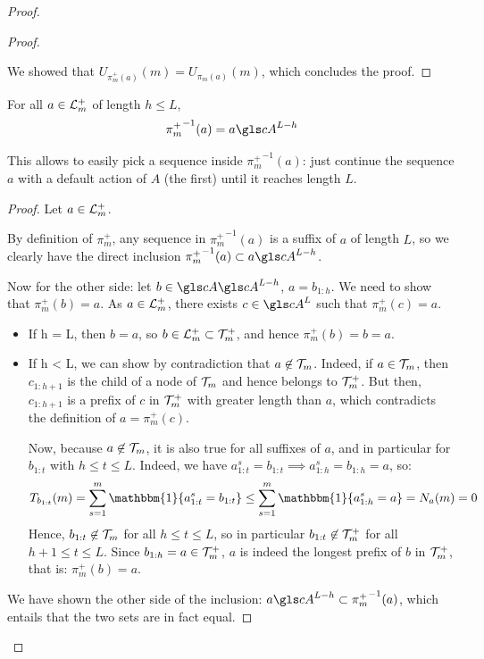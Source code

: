 \begin{proof}
\begin{proof}
\begin{itemize}
		\end{itemize}
		We showed that $U_{\pi_m^+(a)}(m) = U_{\pi_m(a)}(m)$, which concludes the proof.
	\end{proof}
	
	\begin{lemma}
		\begin{leftbar}[lemmabar]
		\label{lemma:inverse-proj}
		For all $a\in \mathcal{L}_m^+$ of length $h\leq L$,
		\begin{equation*}
		{\pi_m^+}^{-1}(a) = a \cA^{L-h}
		\end{equation*}
		
		This allows to easily pick a sequence inside ${\pi_m^+}^{-1}(a)$: just continue the sequence $a$ with a default action of $A$ (\eg the first) until it reaches length $L$.
		\end{leftbar}
	\end{lemma}
	\begin{proof}
		Let $a\in \mathcal{L}_m^+$. 
		
		By definition of $\pi_m^+$, any sequence in ${\pi_m^+}^{-1}(a)$ is a suffix of $a$ of length $L$, so we clearly have the direct inclusion ${\pi_m^+}^{-1}(a) \subset a \cA^{L-h}$.
		
		Now for the other side: let $b\in \cA \cA^{L-h}$, \ie $a=b_{1:h}$. We need to show that $\pi_m^+(b) = a$.
		As $a\in \mathcal{L}_m^+$, there exists $c\in \cA^L$ such that $\pi_m^+(c) = a$.
		\begin{itemize}
			\item If h = L, then $b=a$, so $b \in \mathcal{L}_m^+ \subset \mathcal{T}_m^+$, and hence $\pi_m^+(b)=b=a$.
			\item If h < L, we can show by contradiction that $a \not \in \mathcal{T}_m$. Indeed, if $a \in \mathcal{T}_m$, then $c_{1:h+1}$ is the child of a node of $\mathcal{T}_m$ and hence belongs to $\mathcal{T}_m^+$. But then, $c_{1:h+1}$ is a prefix of $c$ in $\mathcal{T}_m^+$ with greater length than $a$, which contradicts the definition of $a = \pi_m^+(c)$.
			
			Now, because $a \not \in \mathcal{T}_m$, it is also true for all suffixes of $a$, and in particular for $b_{1:t}$ with $h \leq t \leq L$. Indeed, we have $a^s_{1:t} = b_{1:t} \implies a^s_{1:h} = b_{1:h} = a$, so:
			\begin{equation*}
			T_{b_{1:t}}(m) = \sum_{s=1}^m \mathbbm{1}\{a^s_{1:t} = b_{1:t}\} \leq \sum_{s=1}^m \mathbbm{1}\{a^s_{1:h} = a\} = N_a(m) = 0
			\end{equation*}
			Hence, $b_{1:t} \not \in \mathcal{T}_m$ for all $h \leq t \leq L$, so in particular $b_{1:t} \not \in \mathcal{T}_m^+$ for all $h+1 \leq t \leq L$. Since $b_{1:h} = a \in \mathcal{T}_m^+$, $a$ is indeed the longest prefix of $b$ in $\mathcal{T}_m^+$, that is: $\pi_m^+(b) = a$.
		\end{itemize}
		We have shown the other side of the inclusion: $a \cA^{L-h} \subset {\pi_m^+}^{-1}(a)$, which entails that the two sets are in fact equal.
	\end{proof}
	

\end{proof}
